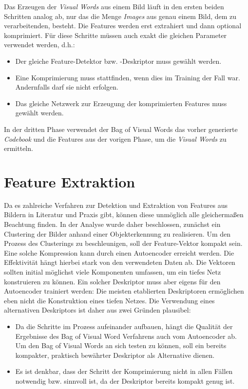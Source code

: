 Das Erzeugen der \textit{Visual Words} aus einem Bild läuft in den ersten beiden Schritten analog ab, nur das die Menge \textit{Images} aus genau einem Bild, dem zu verarbeitenden, besteht. Die Features werden erst extrahiert und dann optional komprimiert. Für diese Schritte müssen auch exakt die gleichen Parameter verwendet werden, d.h.:

\begin{itemize}
	\item Der gleiche Feature-Detektor bzw. -Deskriptor muss gewählt werden.
	\item Eine Komprimierung muss stattfinden, wenn dies im Training der Fall war. Andernfalls darf sie nicht erfolgen.
	\item Das gleiche Netzwerk zur Erzeugung der komprimierten Features muss gewählt werden.
\end{itemize}

In der dritten Phase verwendet der Bag of Visual Words das vorher generierte \textit{Codebook} und die Features aus der vorigen Phase, um die \textit{Visual Words} zu ermitteln.

\section{Feature Extraktion}

Da es zahlreiche Verfahren zur Detektion und Extraktion von Features aus Bildern in Literatur und Praxis gibt, können diese unmöglich alle gleichermaßen Beachtung finden. In der Analyse wurde daher beschlossen, zunächst ein Clustering der Bilder anhand einer Objekterkennung zu realisieren. Um den Prozess des Clusterings zu beschleunigen, soll der Feature-Vektor kompakt sein. Eine solche Kompression kann durch einen Autoencoder erreicht werden. Die Effektivität hängt hierbei stark von den verwendeten Daten ab. Die Vektoren sollten initial möglichst viele Komponenten umfassen, um ein tiefes Netz konstruieren zu können. Ein solcher Deskriptor muss aber eigens für den Autoencoder trainiert werden: Die meisten etablierten Deskriptoren ermöglichen eben nicht die Konstruktion eines tiefen Netzes. Die Verwendung eines alternativen Deskriptors ist daher aus zwei Gründen plausibel:

\begin{itemize}
	\item Da die Schritte im Prozess aufeinander aufbauen, hängt die Qualität der Ergebnisse des Bag of Visual Word Verfahrens auch vom Autoencoder ab. Um den Bag of Visual Words an sich testen zu können, soll ein bereits kompakter, praktisch bewährter Deskriptor als Alternative dienen.
	\item Es ist denkbar, dass der Schritt der Komprimierung nicht in allen Fällen notwendig bzw. sinnvoll ist, da der Deskriptor bereits kompakt genug ist.
\end{itemize} 

